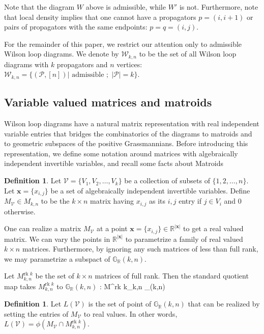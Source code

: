 \documentclass[11pt]{article}
\newcommand{\R}{\mathbb{R}}
\newcommand{\Grall}{\mathbb{G}_{\R}}
\newcommand{\rk}{\textrm{rk }}
\def\ba #1\ea{\begin{align} #1 \end{align}}
\newcommand{\cP}{\mathcal{P}}
\newcommand{\cV}{\mathcal{V}}
\newcommand{\cW}{\mathcal{W}}
\theoremstyle{remark}
\theoremstyle{definition}
\newtheorem{dfn}[thm]{Definition}
\begin{document}
Note that the diagram $W$ above is admissible, while $W'$ is not. Furthermore, note that local density implies that one cannot have a propagators $p = (i, i+1)$ or pairs of propagators with the same endpoints: $p = q = (i, j)$.

For the remainder of this paper, we restrict our attention only to admissible Wilson loop diagrams. We denote by $\cW_{k,n}$ to be the set of all Wilson loop diagrams with $k$ propagators and $n$ vertices: $\cW_{k,n} = \{ (\cP,[n])| \textrm{ admissible }; \; |\cP| = k\}$. 


\subsection{Variable valued matrices and matroids \label{sec:matrices and matroids}}

Wilson loop diagrams have a natural matrix representation with real independent variable entries that bridges the combinatorics of the diagrams to matroids and to geometric subspaces of the positive Grassmannians. Before introducing this representation, we  define some notation around matrices with algebraically independent invertible variables, and recall some facts about Matroids

\begin{dfn} \label{dfn:variablevaluedmatrix}
Let $\cV = \{V_1, V_2, \dots, V_k\}$ be a collection of subsets of $\{1,2,\dots,n\}$. Let $\mathbf{x}=\{x_{i,j}\}$ be a set of algebraically independent invertible variables. Define $M_{\mathcal{V}}\in M_{k,n}$ to be the $k \times n$ matrix having $x_{i,j}$ as its $i,j$ entry if $j \in V_i$ and $0$ otherwise.
\end{dfn}

One can realize a matrix $M_\cV$ at a point $\mathbf{x}=\{x_{i,j}\} \in \R^{|\mathbf{x}|}$ to get a real valued matrix. We can vary the points in $\R^{|\mathbf{x}|}$ to parametrize a family of real valued $k \times n$ matrices. Furthermore, by ignoring any such matrices of less than full rank, we may parametrize a subspact of $\Grall(k,n)$.

Let $M^{\rk k}_{k,n}$ be the set of $k \times n$ matrices of full rank. Then the standard quotient map takes $M^{\rk k}_{k,n}$ to $\Grall(k,n)$ \ba \phi: M^{\rk k}_{k,n} \rightarrow \Grall(k,n)  \label{eq:maps}\ea

\begin{dfn} \label{dfn:loci}
  Let $L(\cV)$ is the set of point of $\Grall(k,n)$ that can be realized by setting the entries of $M_\cV$ to real values. In other words, $L(\cV) = \phi (M_{\cV} \cap M^{\rk k}_{k,n})$.  
\end{dfn}
\end{document}
